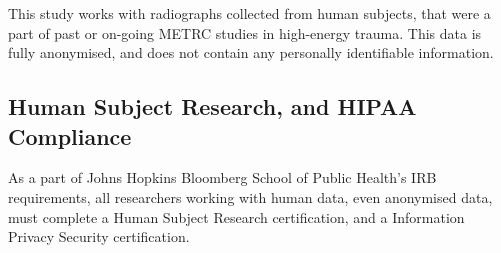 This study works with radiographs collected from human subjects, that were a part of past or on-going METRC studies in high-energy trauma. This data is fully anonymised, and does not contain any personally identifiable information. 

\subsection{Human Subject Research, and HIPAA Compliance}

As a part of Johns Hopkins Bloomberg School of Public Health's IRB requirements, all researchers working with human data, even anonymised data, must complete a Human Subject Research certification, and a Information Privacy Security certification.